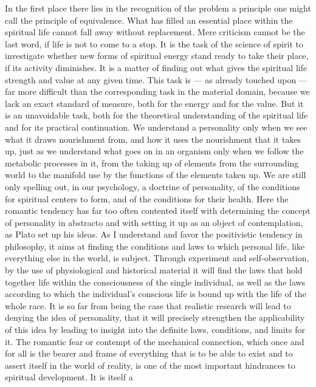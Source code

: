 \documentclass[12pt,a4paper,openany]{book}
\newcommand{\opage}[1]{\marginnote{\footnotesize\textit{[#1]}}}
\begin{document}
In the first place there lies in the recognition of the problem
a principle one might call the principle of equivalence. What
has filled an essential place within the spiritual
life cannot fall away without replacement. Mere
criticism cannot be the last word, if life is not to
come to a stop. It is the task of the science of spirit to investigate
whether new forms of spiritual energy stand ready to
take their place, if its activity diminishes. It is a matter of
finding out what gives the spiritual life strength and value
at any given time. This task is --- as already
touched upon --- far more difficult than the corresponding task
in the material domain, because we lack an exact
standard of measure, both for the energy and for the value. But it
\opage{240}is an unavoidable task, both for the theoretical understanding of
the spiritual life and for its practical continuation. We
understand a personality only when we see what it draws
nourishment from, and how it uses the nourishment that it
takes up, just as we understand what goes on in an
organism only when we follow the metabolic processes in it,
from the taking up of elements from the surrounding world to
the manifold use by the functions of the elements taken up.
We are still only spelling out, in our psychology, a doctrine of
personality, of the conditions for spiritual
centers to form, and of the conditions for their health. Here
the romantic tendency has far too often contented itself with
determining the concept of personality in abstracto and with
setting it up as an object of contemplation, as Plato
set up his ideas. As I understand and favor
the positivistic tendency in philosophy, it aims at
finding the conditions and laws to which personal life,
like everything else in the world, is subject. Through
experiment and self-observation, by the use of physiological and
historical material it will find the laws that
hold together life within the consciousness of the single individual, as well
as the laws according to which the individual's conscious life is
bound up with the life of the whole race. It is so far from being the case that
realistic research will lead to denying the
idea of personality, that it will precisely strengthen the applicability of this idea
by leading to insight into the definite laws, conditions, and
limits for it. The romantic fear or contempt of
the mechanical connection, which once and for all is the bearer
and frame of everything that is to be able to exist and to assert
itself in the world of reality, is one of the most important
hindrances to spiritual development. It is itself a
\end{document}
